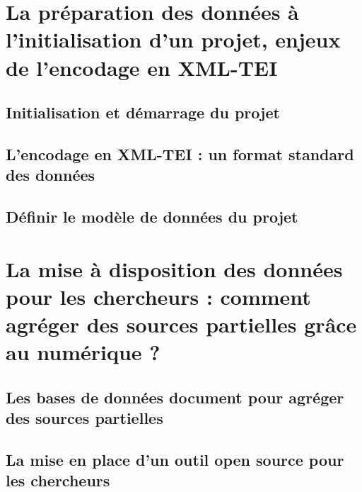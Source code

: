 \documentclass[a4paper,12pt,twoside]{book}
\newcommand{\clearemptydoublepage}{\newpage{\pagestyle{empty}\cleardoublepage}}
\begin{document}
        \clearemptydoublepage


    \part{La préparation des données à l’initialisation d’un projet, enjeux de l’encodage en XML-TEI}
        \chapter{Initialisation et démarrage du projet}
                    
            
        \clearemptydoublepage
        
        \chapter{L’encodage en XML-TEI : un format standard des données}
                    
             
            
        \clearemptydoublepage
        
        \chapter{Définir le modèle de données du projet}
                    
             
            
        \clearemptydoublepage

    \part{La mise à disposition des données pour les chercheurs : comment agréger des sources partielles grâce au numérique ?}
    \chapter{Les bases de données document pour agréger des sources partielles}
                    
            
        \clearemptydoublepage
        
        \chapter{La mise en place d’un outil open source pour les chercheurs}
                    
             
            
        \clearemptydoublepage
        
\end{document}
